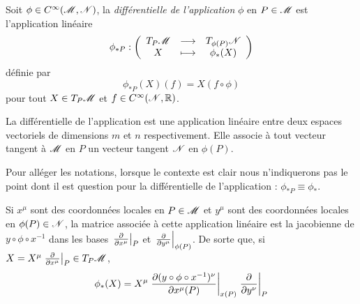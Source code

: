 \documentclass[a4paper,11pt]{report}
\begin{document}
                \begin{definition}
                    Soit $\phi\in C^\infty(\mathscr{M},\mathscr{N})$, la \textit{différentielle de l'application} $\phi$ en $P\in\mathscr{M}$ est l'application linéaire
                    \begin{equation}
                        \phi_{*P}:\left(
                    \begin{array}{ccc}
                        T_P\mathscr{M} & \longrightarrow & T_{\phi(P)}\mathscr{N} \\
                        X & \longmapsto & \phi_*(X)
                    \end{array}
                    \right)
                    \end{equation}
                    définie par
                    \begin{equation}
                        \phi_{*P}(X)(f) = X(f\circ\phi)
                    \end{equation}
                    pour tout $X\in T_P\mathscr{M}$ et $f\in C^{\infty}(\mathscr{N},\mathbb{R})$.
                \end{definition}
                
                La différentielle de l'application est une application linéaire entre deux espaces vectoriels de dimensions $m$ et $n$ respectivement. Elle associe à tout vecteur tangent à $\mathscr{M}$ en $P$ un vecteur tangent $\mathscr{N}$ en $\phi(P)$.
                
                \begin{rmk}
                    Pour alléger les notations, lorsque le contexte est clair nous n'indiquerons pas le point dont il est question pour la différentielle de l'application : $\phi_{*P}\equiv\phi_*$.
                \end{rmk}
                
                \begin{prop}\begin{leftbar}
                    Si $x^\mu$ sont des coordonnées locales en $P\in\mathscr{M}$ et $y^\mu$ sont des coordonnées locales en $\phi(P)\in\mathscr{N}$, la matrice associée à cette application linéaire est la jacobienne de $y\circ\phi\circ x^{-1}$ dans les bases $\eval{\pdv{}{x^\mu}}_{P}$ et  $\eval{\pdv{}{y^\mu}}_{\phi(P)}$. De sorte que, si $X = X^\mu\eval{\pdv{}{x^\mu}}_{P}\in T_P\M$, 
                    \begin{equation}
                        \phi_*(X) = X^\mu\eval{\pdv{(y\circ\phi\circ x^{-1})^\nu}{x^\mu(P)}(x^1(P),\dots,x^n(P))}_{x(P)}\eval{\pdv{}{y^\nu}}_{P}
                    \end{equation}
                \end{leftbar}\end{prop}
                
\end{document}
